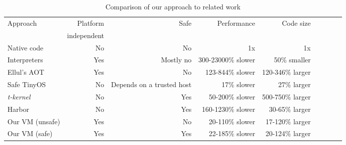 \begin{table*}[]
\centering
\caption{Comparison of our approach to related work}
\label{tbl-contribution-comparison}
\begin{tabular}{lrrrrrrrr}
\toprule
Approach        & Platform    & Safe               & Performance        & Code size               \\
                & independent &                    &                    & \\
\midrule
Native code     & No          & No                 & 1x                 & 1x                      \\
Interpreters    & Yes         & Mostly no          & 300-23000\% slower & ~50\% smaller           \\
Ellul's AOT     & Yes         & No                 & 123-844\% slower   & 120-346\% larger        \\
Safe TinyOS     & No          & Depends on a trusted host   & 17\% slower        & 27\% larger             \\
\emph{t-kernel} & No          & Yes                & 50-200\% slower    & 500-750\% larger        \\
Harbor          & No          & Yes                & 160-1230\% slower  & 30-65\% larger          \\
Our VM (unsafe) & Yes         & No                 & 20-110\% slower    & 17-120\% larger         \\
Our VM (safe)   & Yes         & Yes                & 22-185\% slower    & 20-124\% larger         \\
\bottomrule
\end{tabular}
\end{table*}
